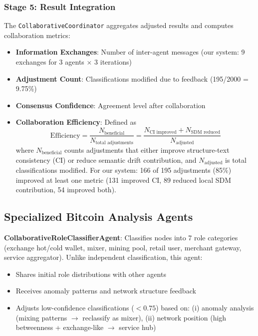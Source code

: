\documentclass[conference]{IEEEtran}
\begin{document}
\subsubsection{Stage 5: Result Integration}
The \texttt{CollaborativeCoordinator} aggregates adjusted results and computes collaboration metrics:
\begin{itemize}
    \item \textbf{Information Exchanges}: Number of inter-agent messages (our system: 9 exchanges for 3 agents $\times$ 3 iterations)
    \item \textbf{Adjustment Count}: Classifications modified due to feedback (195/2000 = 9.75\%)
    \item \textbf{Consensus Confidence}: Agreement level after collaboration
    \item \textbf{Collaboration Efficiency}: Defined as
    \begin{equation}
    \text{Efficiency} = \frac{N_{\text{beneficial}}}{N_{\text{total adjustments}}} = \frac{N_{\text{CI improved}} + N_{\text{SDM reduced}}}{N_{\text{adjusted}}}
    \end{equation}
    where $N_{\text{beneficial}}$ counts adjustments that either improve structure-text consistency (CI) or reduce semantic drift contribution, and $N_{\text{adjusted}}$ is total classifications modified. For our system: 166 of 195 adjustments (85\%) improved at least one metric (131 improved CI, 89 reduced local SDM contribution, 54 improved both).
\end{itemize}

\subsection{Specialized Bitcoin Analysis Agents}

\textbf{CollaborativeRoleClassifierAgent}: Classifies nodes into 7 role categories (exchange hot/cold wallet, mixer, mining pool, retail user, merchant gateway, service aggregator). Unlike independent classification, this agent:
\begin{itemize}
    \item Shares initial role distributions with other agents
    \item Receives anomaly patterns and network structure feedback
    \item Adjusts low-confidence classifications ($< 0.75$) based on: (i) anomaly analysis (mixing patterns $\rightarrow$ reclassify as mixer), (ii) network position (high betweenness + exchange-like $\rightarrow$ service hub)
\end{itemize}
\end{document}
